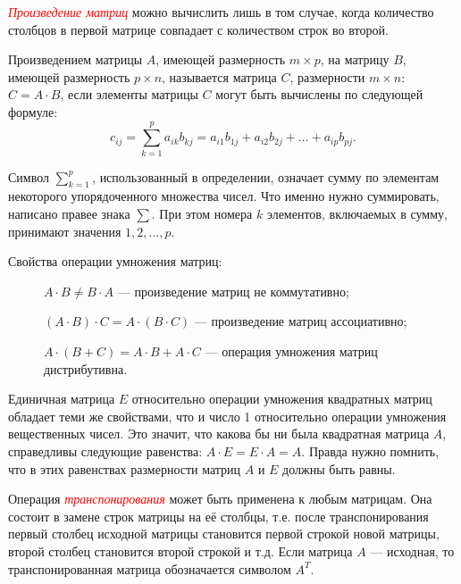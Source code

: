 \documentclass[10pt]{article}
\newcommand{\sym}{\textcolor{red}{\ding{229}}}
\newenvironment{defnt}%
{\begin{center}\fboxsep=1.6\fboxrule \shadowsize=4pt\begin{Sbox}
\begin{minipage}[c]{0.58\textwidth}}%
{\end{minipage}\end{Sbox}\shadowbox{\fboxsep=5pt\colorbox[rgb]{1,0.725,0.474}{\TheSbox}}
\end{center}}
\numberwithin{primer}{section}
\newcommand{\term}[1]{\textcolor{red}{\emph{#1}}}
\numberwithin{equation}{section}
\begin{document}
\newpage
\term{Произведение матриц} можно вычислить лишь в том случае,
когда количество столбцов в первой матрице совпадает с количеством
строк во второй.
\begin{defnt}   Произведением матрицы $A$, имеющей размерность $m\times
p$, на матрицу $B$, имеющей размерность $p\times n$, называется
матрица $C$, размерности $m\times n$: $C=A\cdot B$, если элементы
матрицы $C$ могут быть вычислены по следующей формуле:
\begin{equation}\label{eq:proizvmatrix}
    c_{ij}=\sum^p_{k=1}a_{ik}b_{kj}=a_{i1}b_{1j}+a_{i2}b_{2j}+\ldots+a_{ip}b_{pj}.
\end{equation}
\end{defnt}

Символ $\sum^p_{k=1}$, использованный в определении, означает сумму
по элементам некоторого упорядоченного множества
чисел. Что именно нужно суммировать, написано правее знака $\sum$.
При этом номера $k$ элементов, включаемых в сумму, принимают
значения $1,2,\ldots,p$.

Свойства операции умножения матриц:
\begin{description}
    \item[\sym] $A\cdot B\neq B\cdot A$ --- произведение матриц не коммутативно;
    \item[\sym] $\left(A\cdot B\right)\cdot C=A\cdot\left(B\cdot C\right)$ ---
    произведение матриц ассоциативно;
    \item[\sym] $A\cdot \left(B+C\right)=A\cdot B+A\cdot C$ ---
    операция умножения матриц дистрибутивна.
\end{description}

Единичная матрица $E$ относительно операции умножения квадратных
матриц обладает теми же свойствами, что и число 1 относительно
операции умножения вещественных чисел. Это значит, что какова бы
ни была квадратная матрица $A$, справедливы следующие равенства:
$A\cdot E=E\cdot A=A$. Правда нужно помнить, что в этих равенствах
размерности матриц $A$ и $E$ должны быть равны.


\newpage
Операция \term{транспонирования} может быть применена к любым
матрицам. Она состоит в замене строк матрицы на её столбцы, т.е.
после транспонирования первый столбец исходной матрицы становится
первой строкой новой матрицы, второй столбец становится второй
строкой и т.д. Если матрица $A$ --- исходная, то транспонированная
матрица обозначается символом $A^{T}$.
\end{document}
